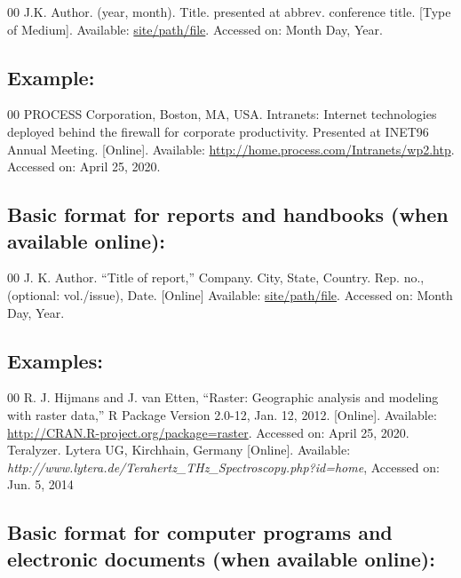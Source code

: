 \documentclass{IEEEtran}
\begin{document}
\begin{thebibliography}{00}
 J.K. Author. (year, month). Title. presented at abbrev. conference title.
[Type of Medium]. Available: \underline{site/path/file}. Accessed on: Month Day, Year.
\end{thebibliography}

\subsection*{Example:}

\begin{thebibliography}{00}
 PROCESS Corporation, Boston, MA, USA. Intranets: Internet technologies deployed behind the firewall for corporate productivity. Presented at INET96 Annual Meeting. [Online]. Available: \underline {http://home.process.com/Intranets/wp2.htp}. Accessed on: April 25, 2020.
\end{thebibliography}

\subsection*{Basic format for reports and handbooks (when available online): }

\begin{thebibliography}{00}
 J. K. Author. ``Title of report,'' Company. City, State, Country. Rep. no.,
(optional: vol./issue), Date. [Online] Available:
\underline{site/path/file}. Accessed
on: Month Day, Year.
\end{thebibliography}

\subsection*{Examples:}

\begin{thebibliography}{00}
 R. J. Hijmans and J. van Etten, ``Raster: Geographic analysis and modeling with raster data,'' R Package Version 2.0-12, Jan. 12, 2012. [Online]. Available: \underline {http://CRAN.R-project.org/package=raster}. Accessed on: April 25, 2020.
 Teralyzer. Lytera UG, Kirchhain, Germany [Online]. Available: \emph{http://www.lytera.de/Terahertz\_THz\_Spectroscopy.php?id=home}, Accessed on: Jun. 5, 2014
\end{thebibliography}

\subsection*{Basic format for computer programs and electronic documents (when available online): }
\end{document}
